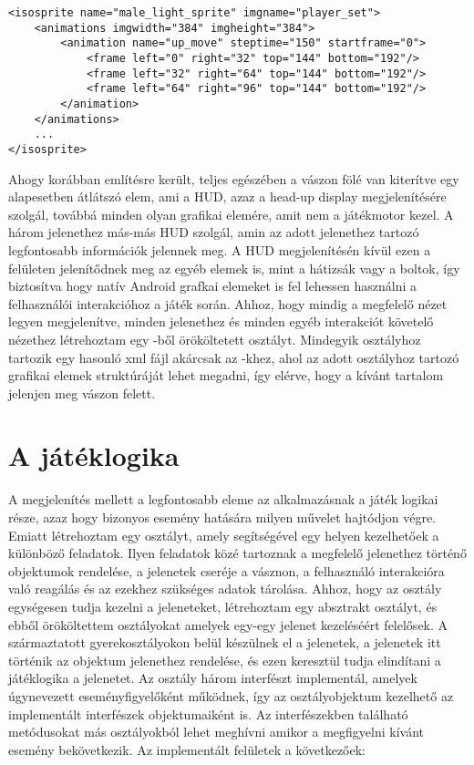 \begin{lstlisting}
<isosprite name="male_light_sprite"	imgname="player_set">
    <animations imgwidth="384" imgheight="384">
        <animation name="up_move" steptime="150" startframe="0">
            <frame left="0" right="32" top="144" bottom="192"/>
            <frame left="32" right="64" top="144" bottom="192"/>
            <frame left="64" right="96" top="144" bottom="192"/>
        </animation>
    </animations>
    ...
</isosprite>

\end{lstlisting}


Ahogy korábban említésre került, teljes egészében a vászon fölé van kiterítve egy alapesetben átlátszó elem, ami a HUD, azaz a head-up display megjelenítésére szolgál, továbbá minden olyan grafikai elemére, amit nem a játékmotor kezel. 
A három jelenethez más-más HUD szolgál, amin az adott jelenethez tartozó legfontosabb információk jelennek meg. 
A HUD megjelenítésén kívül ezen a felületen jelenítődnek meg az egyéb elemek is, mint a hátizsák vagy a boltok, így biztosítva hogy natív Android grafkai elemeket is fel lehessen használni a felhasználói interakcióhoz a játék során. 
Ahhoz, hogy mindig a megfelelő nézet legyen megjelenítve, minden jelenethez és minden egyéb interakciót követelő nézethez létrehoztam egy -ből örököltetett osztályt. 
Mindegyik osztályhoz tartozik egy hasonló xml fájl akárcsak az -khez, ahol az adott osztályhoz tartozó grafikai elemek struktúráját lehet megadni, így elérve, hogy a kívánt tartalom jelenjen meg vászon felett. 

\section{A játéklogika}
\label{logika}

A megjelenítés mellett a legfontosabb eleme az alkalmazásnak a játék logikai része, azaz hogy bizonyos esemény hatására milyen művelet hajtódjon végre.
Emiatt létrehoztam egy  osztályt, amely segítségével egy helyen kezelhetőek a különböző feladatok. 
Ilyen feladatok közé tartoznak a megfelelő jelenethez történő  objektumok rendelése, a jelenetek cseréje a vásznon, a felhasználó interakcióra való reagálás és az ezekhez szükséges adatok tárolása. 
Ahhoz, hogy az osztály egységesen tudja kezelni a jeleneteket, létrehoztam egy  absztrakt osztályt, és ebből örököltettem osztályokat amelyek egy-egy jelenet kezeléséért felelősek. 
A származtatott gyerekosztályokon belül készülnek el a jelenetek, a jelenetek itt történik az  objektum jelenethez rendelése, és ezen keresztül tudja elindítani a játéklogika a jelenetet. 
Az osztály három interfészt implementál, amelyek úgynevezett eseményfigyelőként működnek, így az osztályobjektum kezelhető az implementált interfészek objektumaiként is. 
Az interfészekben található metódusokat más osztályokból lehet meghívni amikor a megfigyelni kívánt esemény bekövetkezik. 
Az implementált felületek a következőek:

